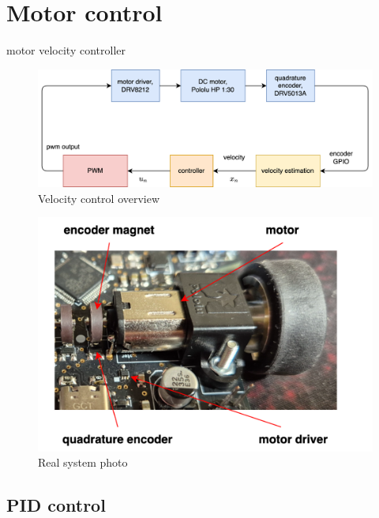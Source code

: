 \documentclass[12pt,twoside,onecolumn,openany,extrafontsizes,dvipsnames]{memoir}
\begin{document}
\newpage
\chapter{Motor control}

    motor velocity controller

    \begin{figure}[!htb]
        \centering
        \includegraphics[scale=0.6]{../diagrams/control_generic/control_generic-motor_control.png}
        \caption{Velocity control overview}
        \label{fig:velocity_control_overview}
    \end{figure}

    \begin{figure}[!htb]
        \centering
        \includegraphics[scale=0.8]{../diagrams/control_generic/control_generic-motor_control_photo.png}
        \caption{Real system photo}
        \label{fig:velocity_control_real}
    \end{figure}




    \newpage
    \section{PID control}
\end{document}
